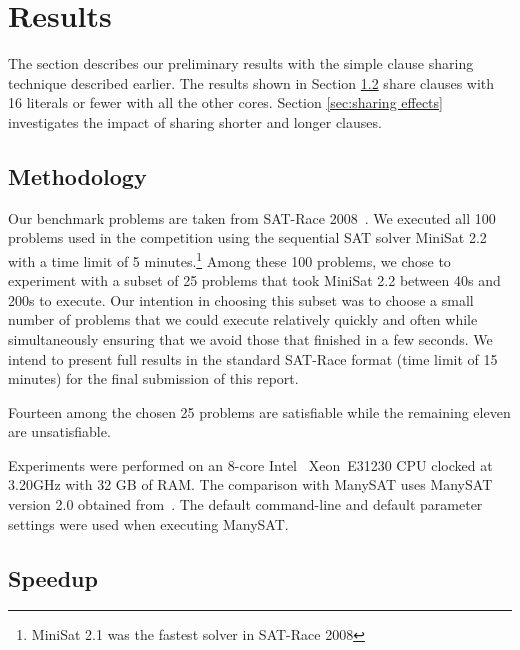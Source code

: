 \documentclass[letterpaper, compsoc, conference]{IEEEtran}
\begin{document}
\section{Results}
\label{sec:results}

The section describes our preliminary results with the simple clause sharing
technique described earlier. The results shown in Section \ref{sec:speedup}
share clauses with 16 literals or fewer with all the other cores. Section
\ref{sec:sharing effects} investigates the impact of sharing shorter
and longer clauses.

\subsection{Methodology}
Our benchmark problems are taken from SAT-Race 2008~\cite{SATRace2008}. We
executed all 100 problems used in the competition using the sequential SAT
solver MiniSat 2.2 with a time limit of 5 minutes.\footnote{MiniSat 2.1 was the
fastest solver in SAT-Race 2008} Among these 100 problems, we chose to
experiment with a subset of 25 problems that took MiniSat 2.2 between 40s and
200s to execute. Our intention in choosing this subset was to choose a small
number of problems that we could execute relatively quickly and often while
simultaneously ensuring that we avoid those that finished in a few seconds.  We
intend to present full results in the standard SAT-Race format (time limit of
15 minutes) for the final submission of this report.

Fourteen among the chosen 25 problems are satisfiable while the remaining
eleven are unsatisfiable.

Experiments were performed on an 8-core Intel\textregistered
~Xeon\textregistered ~E31230 CPU clocked at 3.20GHz with 32 GB of RAM. The
comparison with ManySAT uses ManySAT version 2.0 obtained
from~\cite{ManySATWeb}.  The default command-line and default parameter
settings were used when executing ManySAT.


\subsection{Speedup}
\label{sec:speedup}
\end{document}
